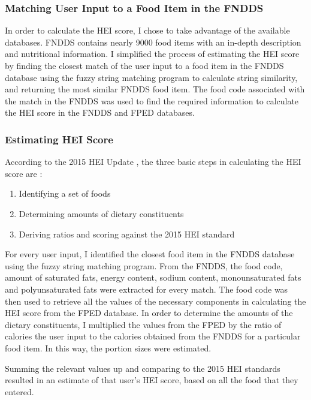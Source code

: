 \documentclass{article}
\begin{document}
\subsubsection{Matching User Input to a Food Item in the FNDDS}
In order to calculate the HEI score, I chose to take advantage of the available databases. FNDDS contains nearly 9000 food items with an in-depth description and nutritional information. I simplified the process of estimating the HEI score by finding the closest match of the user input to a food item in the FNDDS database using the fuzzy string matching program to calculate string similarity, and returning the most similar FNDDS food item. The food code associated with the match in the FNDDS was used to find the required information to calculate the HEI score in the FNDDS and FPED databases. 

\subsubsection{Estimating HEI Score}
\noindent According to the 2015 HEI Update \cite{hei_2015}, the three basic steps in calculating the HEI score are : 

\begin{enumerate}
    \item Identifying a set of foods
    \item Determining amounts of dietary constituents
    \item Deriving ratios and scoring against the 2015 HEI standard
\end{enumerate}

\noindent For every user input, I identified the closest food item in the FNDDS database using the fuzzy string matching program. From the FNDDS, the food code, amount of saturated fats, energy content, sodium content, monounsaturated fats and polyunsaturated fats were extracted for every match. The food code was then used to retrieve all the values of the necessary components in calculating the HEI score from the FPED database. In order to determine the amounts of the dietary constituents, I multiplied the values from the FPED by the ratio of calories the user input to the calories obtained from the FNDDS for a particular food item. In this way, the portion sizes were estimated.

\bigskip
\noindent Summing the relevant values up and comparing to the 2015 HEI standards resulted in an estimate of that user's HEI score, based on all the food that they entered. 
\end{document}
